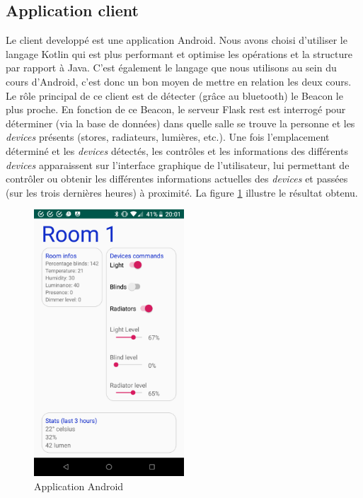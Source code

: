 \subsection{Application client}
Le client developpé est une application Android. Nous avons choisi d'utiliser le langage Kotlin qui est plus performant et optimise les opérations et la structure par rapport à Java. C'est également le langage que nous utilisons au sein du cours d'Android, c'est donc un bon moyen de mettre en relation les deux cours.
Le rôle principal de ce client est de détecter (grâce au bluetooth) le Beacon le plus proche. En fonction de ce Beacon, le serveur Flask \acrshort{rest} est interrogé pour déterminer (via la base de données) dans quelle salle se trouve la personne et les \textit{\textit{devices}} présents (stores, radiateurs, lumières, etc.). Une fois l'emplacement déterminé et les \textit{\textit{devices}} détectés, les contrôles et les informations des différents \textit{\textit{devices}} apparaissent sur l'interface graphique de l'utilisateur, lui permettant de contrôler ou obtenir les différentes informations actuelles des \textit{\textit{devices}} et passées (sur les trois dernières heures) à proximité. La figure \ref{app_android} illustre le résultat obtenu.
\begin{figure}
    \begin{center}
        \includegraphics[width=0.5\textwidth]{img/app.png}
    \end{center}
    \caption{Application Android}
    \label{app_android}
\end{figure}

